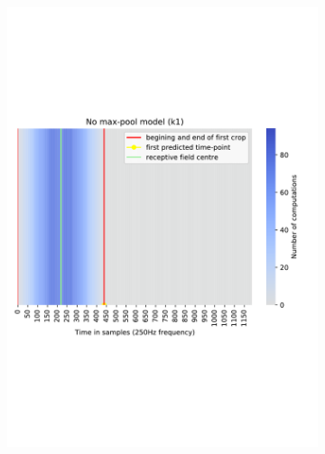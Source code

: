\begin{figure}[!htpb]
\begin{subfigure}[b]{0.48\textwidth}
   \includegraphics[width=0.95\linewidth]{img/ch3/k1-receptive-field}
   \caption{}
\end{subfigure}
\caption[]{}
\end{figure}\label{fig:receptive-field-comparison}

